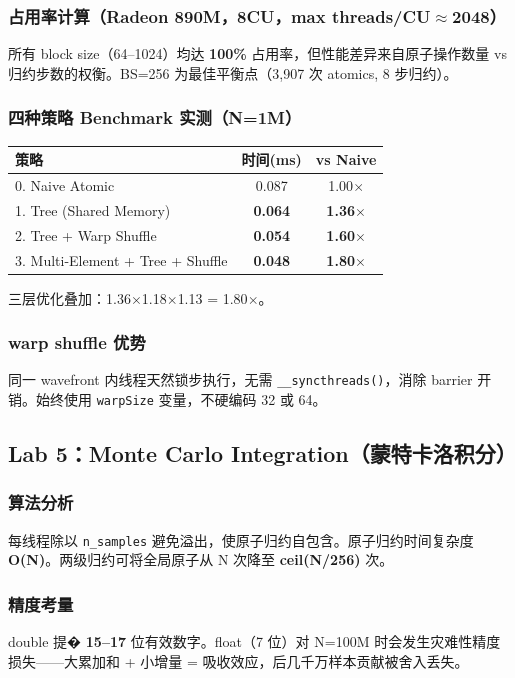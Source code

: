 \documentclass[12pt,a4paper]{article}
\newcommand{\ans}[1]{\textcolor{answerblue}{\textbf{#1}}}
\begin{document}
\subsubsection*{占用率计算（Radeon 890M，8CU，max threads/CU$\approx$2048）}
所有 block size（64--1024）均达 \ans{100\%} 占用率，但性能差异来自原子操作数量 vs 归约步数的权衡。BS=256 为最佳平衡点（3,907 次 atomics, 8 步归约）。

\subsubsection*{四种策略 Benchmark 实测（N=1M）}
\begin{table}[H]
\centering
\begin{tabular}{lcc}
\toprule
策略 & 时间(ms) & vs Naive \\
\midrule
0. Naive Atomic          & 0.087 & 1.00$\times$ \\
1. Tree (Shared Memory)  & \ans{0.064} & \ans{1.36$\times$} \\
2. Tree + Warp Shuffle   & \ans{0.054} & \ans{1.60$\times$} \\
3. Multi-Element + Tree + Shuffle & \ans{0.048} & \ans{1.80$\times$} \\
\bottomrule
\end{tabular}
\end{table}
三层优化叠加：1.36$\times$1.18$\times$1.13 = 1.80$\times$。

\subsubsection*{warp shuffle 优势}
同一 wavefront 内线程天然锁步执行，无需 \texttt{\_\_syncthreads()}，消除 barrier 开销。始终使用 \texttt{warpSize} 变量，不硬编码 32 或 64。

\subsection{Lab 5：Monte Carlo Integration（蒙特卡洛积分）}

\subsubsection*{算法分析}
每线程除以 \texttt{n\_samples} 避免溢出，使原子归约自包含。原子归约时间复杂度 \ans{O(N)}。两级归约可将全局原子从 N 次降至 \ans{ceil(N/256)} 次。

\subsubsection*{精度考量}
double 提� \ans{15--17} 位有效数字。float（7 位）对 N=100M 时会发生灾难性精度损失——大累加和 + 小增量 = 吸收效应，后几千万样本贡献被舍入丢失。
\end{document}
